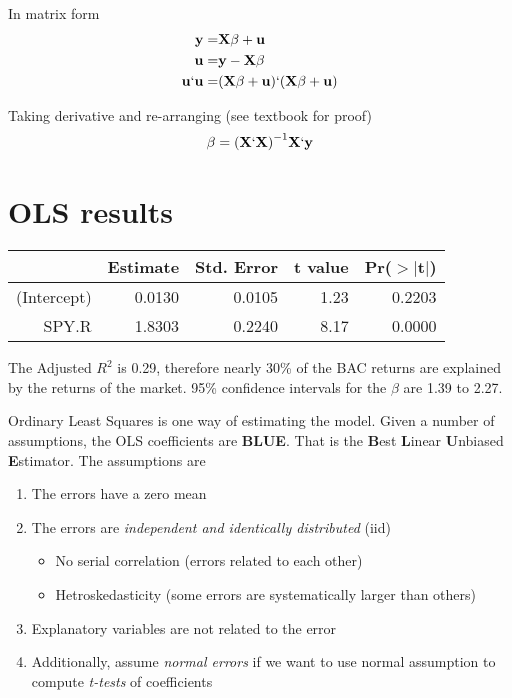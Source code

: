 \documentclass{article}\usepackage[]{graphicx}\usepackage[]{color}
\begin{document}
In matrix form
\begin{align*}
\mathbf{y} =& \mathbf{X \beta} + \mathbf{u}\\
\mathbf{u} =& \mathbf{y} - \mathbf{X\beta}\\
\mathbf{u}` \mathbf{u} =& (\mathbf{X \beta} + \mathbf{u})`(\mathbf{X \beta} + \mathbf{u})\\ 
\end{align*}

Taking derivative and re-arranging (see textbook for proof)
\begin{align*}
\mathbf{\beta} = \mathbf{(X`X)}^{-1}\mathbf{X`y}
\end{align*}

\section{OLS results}

\begin{table}[ht]
\centering
\begin{tabular}{rrrrr}
  \hline
 & Estimate & Std. Error & t value & Pr($>$$|$t$|$) \\ 
  \hline
(Intercept) & 0.0130 & 0.0105 & 1.23 & 0.2203 \\ 
  SPY.R & 1.8303 & 0.2240 & 8.17 & 0.0000 \\ 
   \hline
\end{tabular}
\end{table}
The Adjusted $R^2$ is 0.29, therefore nearly 30\% of the BAC returns are explained by the returns of the market.  95\% confidence intervals for the $\beta$ are 1.39 to 2.27. 

Ordinary Least Squares is one way of estimating the model.  Given a number of assumptions, the OLS coefficients are \textbf{BLUE}.  That is the \textbf{B}est \textbf{L}inear \textbf{U}nbiased \textbf{E}stimator.  The assumptions are 
\begin{enumerate}
\item The errors have a zero mean
\item The errors are \emph{independent and identically distributed} (iid)
\begin{itemize}
\item No serial correlation (errors related to each other)
\item Hetroskedasticity (some errors are systematically larger than others)
\end{itemize}
\item Explanatory variables are not related to the error
\item Additionally, assume \emph{normal errors} if we want to use normal assumption to compute \emph{t-tests} of coefficients
\end{enumerate}
\end{document}
